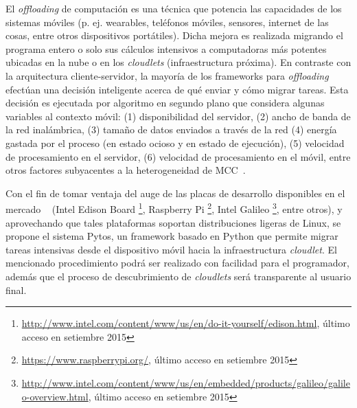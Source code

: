 El \textit{offloading} de computación es una técnica que potencia las capacidades de los sistemas móviles (p. ej. wearables, teléfonos móviles,
sensores, internet de las cosas, entre otros dispositivos portátiles). Dicha mejora es realizada migrando el programa entero o solo sus cálculos intensivos a 
computadoras más potentes ubicadas en la nube o en los \textit{cloudlets} (infraestructura próxima). En contraste con la arquitectura 
cliente-servidor, la mayoría de los frameworks para \textit{offloading} efectúan una decisión inteligente acerca de qué enviar y cómo migrar 
tareas. Esta decisión es ejecutada por algoritmo en segundo plano que considera algunas variables al contexto móvil: (1) disponibilidad del 
servidor, (2) ancho de banda de la red inalámbrica, (3) tamaño de datos enviados a través de la red (4) energía gastada por el proceso (en 
estado ocioso y en estado de ejecución), (5) velocidad de procesamiento en el servidor, (6) velocidad de procesamiento en el móvil, entre otros
factores subyacentes a la heterogeneidad de MCC~\cite{sanaei2014heterogeneity}. 

Con el fin de tomar ventaja del auge de las placas de desarrollo disponibles en el mercado ~\cite{7004894} (Intel Edison Board 
\footnote{\url{http://www.intel.com/content/www/us/en/do-it-yourself/edison.html}, último acceso en setiembre 2015}, Raspberry Pi 
\footnote{ \url{https://www.raspberrypi.org/}, último acceso en setiembre 2015},
Intel Galileo \footnote{\url{http://www.intel.com/content/www/us/en/embedded/products/galileo/galileo-overview.html}, 
último acceso en setiembre 2015 }, entre otros), y aprovechando que tales plataformas
soportan distribuciones ligeras de Linux, se propone el sistema Pytos, un 
framework basado en Python que permite migrar tareas intensivas desde el dispositivo móvil hacia la infraestructura 
\textit{cloudlet}. El mencionado procedimiento podrá ser realizado con facilidad para el programador, además que el proceso de descubrimiento de 
\textit{cloudlets} será transparente al usuario final.

